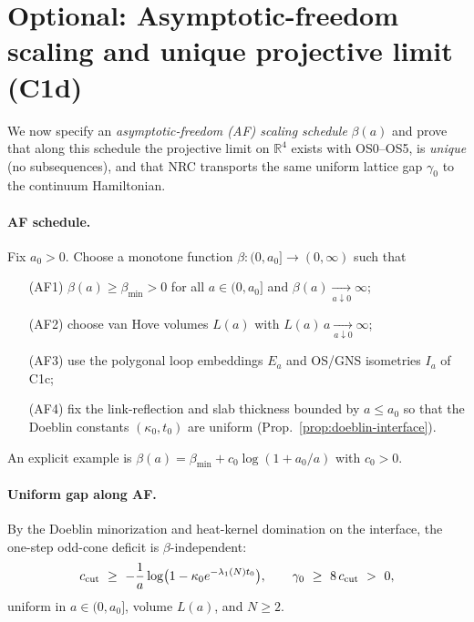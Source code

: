 \documentclass[11pt]{amsart}
\theoremstyle{plain}
\theoremstyle{definition}
\theoremstyle{remark}
\begin{document}
\section{Optional: Asymptotic-freedom scaling and unique projective limit (C1d)}

We now specify an \emph{asymptotic-freedom (AF) scaling schedule} $\beta(a)$ and prove that along this schedule the projective limit on $\mathbb R^4$ exists with OS0--OS5, is \emph{unique} (no subsequences), and that NRC transports the same uniform lattice gap $\gamma_0$ to the continuum Hamiltonian.

\paragraph{AF schedule.}
Fix $a_0>0$. Choose a monotone function $\beta:(0,a_0]\to (0,\infty)$ such that
\begin{itemize}
  \item[(AF1)] $\beta(a)\ge \beta_{\min}>0$ for all $a\in(0,a_0]$ and $\beta(a)\xrightarrow[a\downarrow 0]{}\infty$;
  \item[(AF2)] choose van Hove volumes $L(a)$ with $L(a)\,a\xrightarrow[a\downarrow 0]{}\infty$;
  \item[(AF3)] use the polygonal loop embeddings $E_a$ and OS/GNS isometries $I_a$ of C1c;
  \item[(AF4)] fix the link-reflection and slab thickness bounded by $a\le a_0$ so that the Doeblin constants $(\kappa_0,t_0)$ are uniform (Prop.~\ref{prop:doeblin-interface}).
\end{itemize}
An explicit example is $\beta(a)=\beta_{\min}+c_0\log(1+a_0/a)$ with $c_0>0$.

\paragraph{Uniform gap along AF.}
By the Doeblin minorization and heat-kernel domination on the interface, the one-step odd-cone deficit is $\beta$-independent:
\[
  c_{\rm cut}\ \ge\ -\frac{1}{a}\log\bigl(1-\kappa_0 e^{-\lambda_1(N) t_0}\bigr),\qquad
  \gamma_0\ \ge\ 8\,c_{\rm cut}\ >\ 0,
\]
uniform in $a\in(0,a_0]$, volume $L(a)$, and $N\ge 2$.
\end{document}

